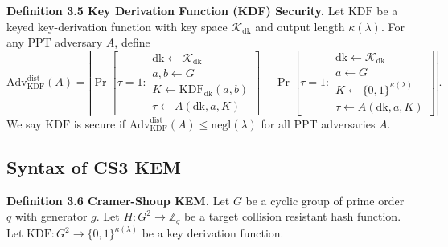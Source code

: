 \noindent\textbf{Definition 3.5 Key Derivation Function (KDF) Security.} Let $\mathrm{KDF}$ be a keyed key-derivation function with key space $\mathcal{K}_{\text{dk}}$ and output length $\kappa(\lambda)$. For any PPT adversary $A$, define
$$
\text{Adv}_{\mathrm{KDF}}^{\text{dist}}(A) = \left|
\Pr\left[\tau=1:\begin{matrix}\text{dk} \gets \mathcal{K}_{\text{dk}} \\ a,b \gets G \\ K \gets \mathrm{KDF}_{\text{dk}}(a,b) \\ \tau \gets A(\text{dk}, a, K)\end{matrix}\right] -
\Pr\left[\tau=1:\begin{matrix}\text{dk} \gets \mathcal{K}_{\text{dk}} \\ a \gets G \\ K \gets \{0,1\}^{\kappa(\lambda)} \\ \tau \gets A(\text{dk}, a, K)\end{matrix}
\right]\right|.
$$
We say $\mathrm{KDF}$ is secure if $\text{Adv}_{\mathrm{KDF}}^{\text{dist}}(A) \le \text{negl}(\lambda)$ for all PPT adversaries $A$.

\subsection{Syntax of CS3 KEM}

\noindent\textbf{Definition 3.6 Cramer-Shoup KEM.} Let $G$ be a cyclic group of prime order $q$ with generator $g$. Let $H: G^2 \to \mathbb{Z}_q$ be a target collision resistant hash function. Let $\text{KDF}: G^2 \to \{0,1\}^{\kappa(\lambda)}$ be a key derivation function.

